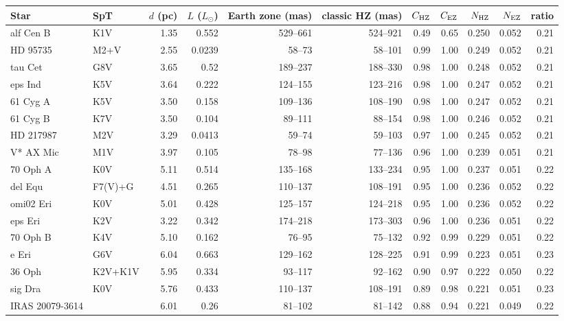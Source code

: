 \documentclass[11pt,a4paper]{article}
\begin{document}
{\scriptsize
\setlength{\tabcolsep}{3pt}
\begin{longtable}{llrrrrrrrrr}
\toprule
\textbf{Star} & \textbf{SpT} & \textbf{$d$ (pc)} & \textbf{$L$ ($L_\odot$)} & \textbf{Earth zone (mas)} & \textbf{classic HZ (mas)} & \textbf{$C_{\rm HZ}$} & \textbf{$C_{\rm EZ}$} & \textbf{$N_{\rm HZ}$} & \textbf{$N_{\rm EZ}$} & \textbf{ratio} \\
\midrule
\endhead
alf Cen B & K1V & 1.35 & 0.552 & 529--661 & 524--921 & 0.49 & 0.65 & 0.250 & 0.052 & 0.21 \\
HD  95735 & M2+V & 2.55 & 0.0239 & 58--73 & 58--101 & 0.99 & 1.00 & 0.249 & 0.052 & 0.21 \\
tau Cet & G8V & 3.65 & 0.52 & 189--237 & 188--330 & 0.98 & 1.00 & 0.248 & 0.052 & 0.21 \\
eps Ind & K5V & 3.64 & 0.222 & 124--155 & 123--216 & 0.98 & 1.00 & 0.247 & 0.052 & 0.21 \\
61 Cyg A & K5V & 3.50 & 0.158 & 109--136 & 108--190 & 0.98 & 1.00 & 0.247 & 0.052 & 0.21 \\
61 Cyg B & K7V & 3.50 & 0.104 & 89--111 & 88--154 & 0.98 & 1.00 & 0.246 & 0.052 & 0.21 \\
HD 217987 & M2V & 3.29 & 0.0413 & 59--74 & 59--103 & 0.97 & 1.00 & 0.245 & 0.052 & 0.21 \\
V* AX Mic & M1V & 3.97 & 0.105 & 78--98 & 77--136 & 0.96 & 1.00 & 0.239 & 0.051 & 0.21 \\
70 Oph A & K0V & 5.11 & 0.514 & 135--168 & 133--234 & 0.95 & 1.00 & 0.237 & 0.051 & 0.22 \\
del Equ & F7(V)+G & 4.51 & 0.265 & 110--137 & 108--191 & 0.95 & 1.00 & 0.236 & 0.052 & 0.22 \\
omi02 Eri & K0V & 5.01 & 0.428 & 125--157 & 124--218 & 0.95 & 1.00 & 0.236 & 0.052 & 0.22 \\
eps Eri & K2V & 3.22 & 0.342 & 174--218 & 173--303 & 0.96 & 1.00 & 0.236 & 0.051 & 0.22 \\
70 Oph B & K4V & 5.10 & 0.162 & 76--95 & 75--132 & 0.92 & 0.99 & 0.229 & 0.051 & 0.22 \\
e Eri & G6V & 6.04 & 0.663 & 129--162 & 128--225 & 0.91 & 0.99 & 0.223 & 0.051 & 0.23 \\
36 Oph & K2V+K1V & 5.95 & 0.334 & 93--117 & 92--162 & 0.90 & 0.97 & 0.222 & 0.050 & 0.22 \\
sig Dra & K0V & 5.76 & 0.433 & 110--137 & 108--191 & 0.89 & 0.98 & 0.221 & 0.051 & 0.23 \\
IRAS 20079-3614 &  & 6.01 & 0.26 & 81--102 & 81--142 & 0.88 & 0.94 & 0.221 & 0.049 & 0.22 \\

\end{longtable}}
\end{document}
